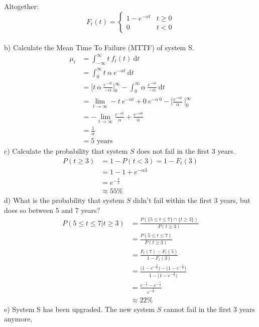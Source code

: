 \documentclass[a4paper,footsepline]{scrartcl}
\begin{document}
	Altogether:
	\[ F_t(t) = \begin{cases} 1-e^{-\alpha t} & t \geq 0\\
	0 & t < 0
	\end{cases} \]
	\vspace{0.4cm}\\
	b) Calculate the Mean Time To Failure (MTTF) of system S.\\
	\begin{align*}
		\mu_t &= \int_{-\infty}^{\infty} t\ f_t(t)\ \text{d} t\\
		&= \int_{0}^{\infty} t\ \alpha\ e^{-\alpha t}\ \text{d} t\\
		&= \Big[ t\ \alpha\  \frac{e^{-\alpha t}}{- \alpha}  \Big]_0^\infty - \int_{0}^{\infty} \alpha\ \frac{e^{-\alpha t}}{- \alpha}\ \text{d} t\\
		&=  \lim\limits_{t \rightarrow \infty} - t\  e^{-\alpha t} + 0\ e^{- \alpha\ 0} - \big[ \frac{e^{-\alpha t}}{\alpha}\ \Big]_0^\infty \\
		&= - \lim\limits_{t \rightarrow \infty} \frac{e^{-\alpha t}}{\alpha}  + \frac{e^{-\alpha 0}}{\alpha}\\
		&= \frac{1}{\alpha}\\
		&= 5 \text{ years}
	\end{align*}
	c) Calculate the probability that system $S$ does not fail in the first 3 years.\\
	\begin{align*}
	 P(t \geq 3) & = 1 - P(t < 3) = 1 - F_t(3) \\
	 &= 1 - 1  + e^{-\alpha 3}\\
	 &= e^{-\frac{3}{5}} \\
	 & \approx 55\%
	\end{align*}
	d) What is the probability that system $S$ didn’t fail within the first 3 years, but does so
	between 5 and 7 years?
	\begin{align*}
		P(5 \leq t \leq 7 | t \geq 3) &= \frac{P(\{5 \leq t \leq 7\} \cap \{t \geq 3\} ) }{P(t \geq 3)}\\
		&= \frac{P(5 \leq t \leq 7)}{P(t \geq 3)}\\
		&= \frac{F_t(7) - F_t(5)}{1-F_t(3)}\\
		&= \frac{\big(1-e^{-\frac{7}{5}}\big) - \big(1-e^{-\frac{5}{5}}\big)}{1-\big(1-e^{-\frac{3}{5}}\big)}\\
		&= \frac{e^{-\frac{5}{5}}-e^{-\frac{7}{5}}}{e^{-\frac{3}{5}}}\\
		&\approx 22\%
	\end{align*}
	e) System S has been upgraded. The new system $S$ cannot fail in the first 3 years anymore,
\end{document}
